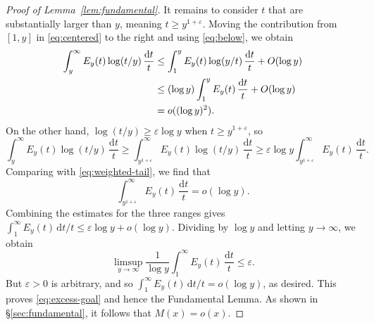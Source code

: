 \documentclass[11pt]{amsart}
\theoremstyle{remark}
\newcommand{\eps}{\varepsilon}
\newcommand{\dt}{\,\frac{\mathrm{d}t}{t}}
\begin{document}
\begin{proof}[Proof of Lemma~\ref{lem:fundamental}]
It remains to consider $t$ that are substantially larger than $y$, meaning $t\ge y^{1+\eps}$. Moving the contribution from
$[1,y]$ in \eqref{eq:centered} to the right and using
\eqref{eq:below}, we obtain
\begin{align}
\int_y^\infty E_y(t)\log(t/y)\dt
&\le\int_1^y E_y(t)\log(y/t)\dt+O(\log y)\notag\\
&\le(\log y)\int_1^y E_y(t)\dt+O(\log y)\notag\\
&=o((\log y)^2).\label{eq:weighted-tail}
\end{align}
On the other hand, $\log(t/y)\ge\eps\log y$ when
$t\ge y^{1+\eps}$, so
\[
\int_y^\infty E_y(t)\log(t/y)\dt
\ge\int_{y^{1+\eps}}^\infty E_y(t)\log(t/y)\dt
\ge\eps\log y\int_{y^{1+\eps}}^\infty E_y(t)\dt.
\]
Comparing with \eqref{eq:weighted-tail}, we find that
\[
\int_{y^{1+\eps}}^\infty E_y(t)\dt=o(\log y).
\]
Combining the estimates for the three ranges gives
$\int_1^\infty E_y(t)\,\mathrm{d}t/t
\le\eps\log y+o(\log y)$. Dividing by $\log y$ and letting $y\to\infty$, we obtain
\[
\limsup_{y\to\infty}\frac1{\log y}
\int_1^\infty E_y(t)\dt\le\eps.
\]
But $\eps>0$ is arbitrary, and so $\int_1^\infty E_y(t) \,\mathrm{d}t/t=o(\log y)$, as desired. This proves \eqref{eq:excess-goal} and hence the Fundamental
Lemma. As shown in \S\ref{sec:fundamental}, it follows that $M(x)=o(x)$.
\end{proof}
\end{document}
